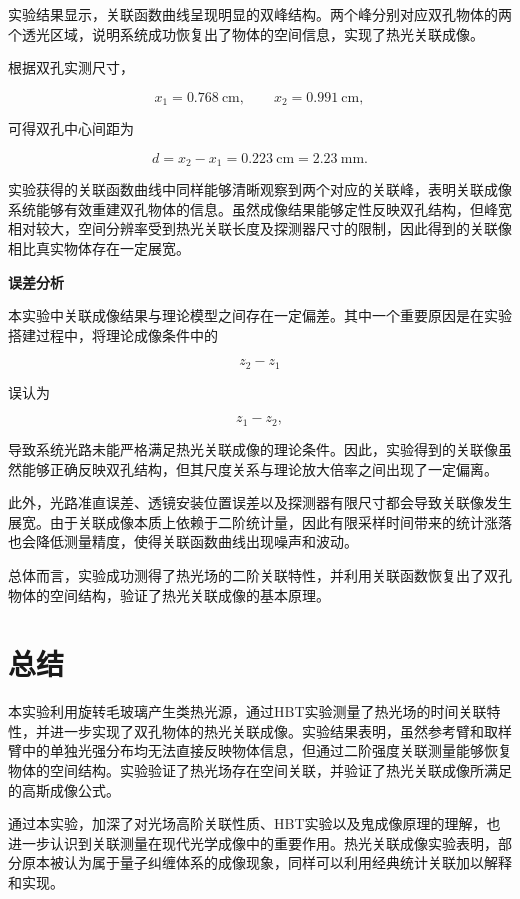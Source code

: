 \documentclass[a4paper]{ctexart}
\begin{document}
实验结果显示，关联函数曲线呈现明显的双峰结构。两个峰分别对应双孔物体的两个透光区域，说明系统成功恢复出了物体的空间信息，实现了热光关联成像。

根据双孔实测尺寸，

\begin{equation}
x_1 = 0.768~\mathrm{cm},
\qquad
x_2 = 0.991~\mathrm{cm},
\end{equation}

可得双孔中心间距为

\begin{equation}
d = x_2-x_1
=0.223~\mathrm{cm}
=2.23~\mathrm{mm}.
\end{equation}

实验获得的关联函数曲线中同样能够清晰观察到两个对应的关联峰，表明关联成像系统能够有效重建双孔物体的信息。虽然成像结果能够定性反映双孔结构，但峰宽相对较大，空间分辨率受到热光关联长度及探测器尺寸的限制，因此得到的关联像相比真实物体存在一定展宽。

\vspace{0.5em}

\textbf{误差分析}

本实验中关联成像结果与理论模型之间存在一定偏差。其中一个重要原因是在实验搭建过程中，将理论成像条件中的

\begin{equation}
z_2-z_1
\end{equation}

误认为

\begin{equation}
z_1-z_2 ,
\end{equation}

导致系统光路未能严格满足热光关联成像的理论条件。因此，实验得到的关联像虽然能够正确反映双孔结构，但其尺度关系与理论放大倍率之间出现了一定偏离。

此外，光路准直误差、透镜安装位置误差以及探测器有限尺寸都会导致关联像发生展宽。由于关联成像本质上依赖于二阶统计量，因此有限采样时间带来的统计涨落也会降低测量精度，使得关联函数曲线出现噪声和波动。

总体而言，实验成功测得了热光场的二阶关联特性，并利用关联函数恢复出了双孔物体的空间结构，验证了热光关联成像的基本原理。
\section{总结}

本实验利用旋转毛玻璃产生类热光源，通过HBT实验测量了热光场的时间关联特性，并进一步实现了双孔物体的热光关联成像。实验结果表明，虽然参考臂和取样臂中的单独光强分布均无法直接反映物体信息，但通过二阶强度关联测量能够恢复物体的空间结构。实验验证了热光场存在空间关联，并验证了热光关联成像所满足的高斯成像公式。

通过本实验，加深了对光场高阶关联性质、HBT实验以及鬼成像原理的理解，也进一步认识到关联测量在现代光学成像中的重要作用。热光关联成像实验表明，部分原本被认为属于量子纠缠体系的成像现象，同样可以利用经典统计关联加以解释和实现。
\end{document}
